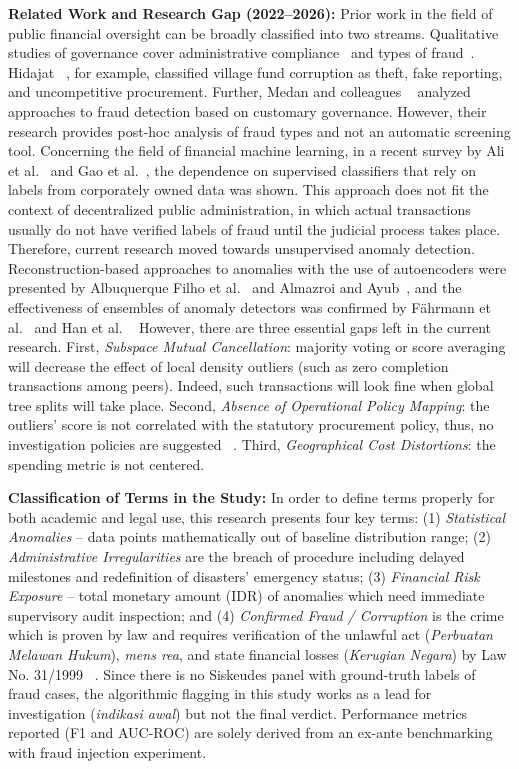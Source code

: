 \documentclass[conference]{IEEEtran}
\begin{document}
\textbf{Related Work and Research Gap (2022--2026):} Prior work in the field of public financial oversight can be broadly classified into two streams. Qualitative studies of governance cover administrative compliance~\cite{ref4,ref5} and types of fraud~\cite{ref6,ref11}. Hidajat~\cite{ref6} , for example, classified village fund corruption as theft, fake reporting, and uncompetitive procurement. Further, Medan and colleagues ~\cite{ref15} analyzed approaches to fraud detection based on customary governance. However, their research provides post-hoc analysis of fraud types and not an automatic screening tool. Concerning the field of financial machine learning, in a recent survey by Ali et al.~\cite{ref_ali2022} and Gao et al.~\cite{ref_gao2024}, the dependence on supervised classifiers that rely on labels from corporately owned data was shown. This approach does not fit the context of decentralized public administration, in which actual transactions usually do not have verified labels of fraud until the judicial process takes place. Therefore, current research moved towards unsupervised anomaly detection. Reconstruction-based approaches to anomalies with the use of autoencoders were presented by Albuquerque Filho et al.~\cite{ref_albuquerque2022} and Almazroi and Ayub~\cite{ref_almazroi2023}, and the effectiveness of ensembles of anomaly detectors was confirmed by Fährmann et al.~\cite{ref_fahrmann2024} and Han et al. ~\cite{ref_han2022adbench} However, there are three essential gaps left in the current research. First, \textit{Subspace Mutual Cancellation}: majority voting or score averaging will decrease the effect of local density outliers (such as zero completion transactions among peers). Indeed, such transactions will look fine when global tree splits will take place. Second,  \textit{Absence of Operational Policy Mapping}: the outliers' score is not correlated with the statutory procurement policy, thus, no investigation policies are suggested ~\cite{ref_almaqtari2024,ref_vukovic2025}. Third,  \textit{Geographical Cost Distortions}: the spending metric is not centered.

\textbf{Classification of Terms in the Study:} In order to define terms properly for both academic and legal use, this research presents four key terms: (1) \textit{Statistical Anomalies} – data points mathematically out of baseline distribution range; (2) \textit{Administrative Irregularities} are the breach of procedure including delayed milestones and redefinition of disasters' emergency status; (3)  \textit{Financial Risk Exposure} – total monetary amount (IDR) of anomalies which need immediate supervisory audit inspection; and (4) \textit{Confirmed Fraud / Corruption} is the crime which is proven by law and requires verification of the unlawful act (\textit{Perbuatan Melawan Hukum}), \textit{mens rea}, and state financial losses (\textit{Kerugian Negara}) by Law No. 31/1999 ~\cite{ref34}. Since there is no Siskeudes panel with ground-truth labels of fraud cases, the algorithmic flagging in this study works as a lead for investigation (\textit{indikasi awal}) but not the final verdict. Performance metrics reported (F1 and AUC-ROC) are solely derived from an ex-ante benchmarking with fraud injection experiment.
\end{document}
